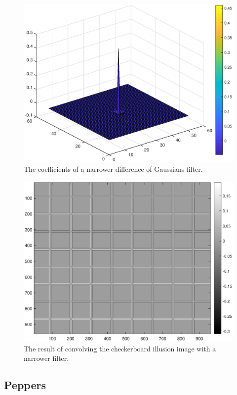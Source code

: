 \documentclass[11pt, oneside]{article}
\begin{document}
\begin{figure}[ht!]
\includegraphics[width=1\textwidth]{dog3.eps}
\caption{The coefficients of a narrower difference of Gaussians filter.}
\label{fig:dog3}
\end{figure}

\begin{figure}[ht!]
\includegraphics[width=1\textwidth]{check_dog3_conv.eps}
\caption{The result of convolving the checkerboard illusion image with a narrower filter.}
\label{fig:checkConv2}
\end{figure}

\subsection{Peppers}
\end{document}
